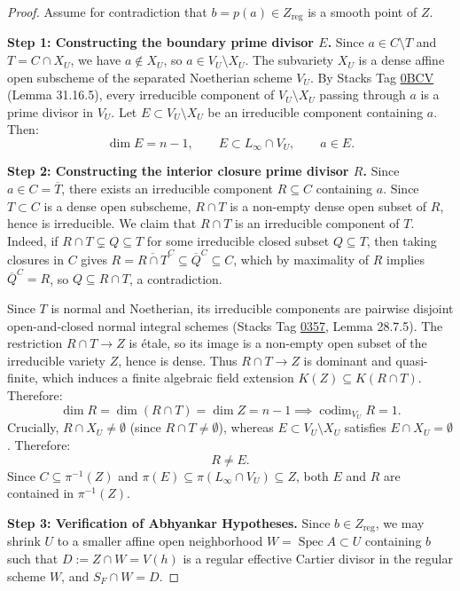 \documentclass[11pt,reqno]{amsart}
\theoremstyle{plain}
\theoremstyle{definition}
\numberwithin{equation}{section}
\DeclareMathOperator{\Spec}{Spec}
\DeclareMathOperator{\codim}{codim}
\begin{document}
\begin{proof}
Assume for contradiction that $b = p(a) \in Z_{\mathrm{reg}}$ is a smooth point of $Z$.

\medskip
\noindent\textbf{Step 1: Constructing the boundary prime divisor $E$.}
Since $a \in C \setminus T$ and $T = C \cap X_U$, we have $a \notin X_U$, so $a \in V_U \setminus X_U$.
The subvariety $X_U$ is a dense affine open subscheme of the separated Noetherian scheme $V_U$. By Stacks Tag \href{https://stacks.math.columbia.edu/tag/0BCV}{0BCV} (Lemma 31.16.5), every irreducible component of $V_U \setminus X_U$ passing through $a$ is a prime divisor in $V_U$. Let $E \subset V_U \setminus X_U$ be an irreducible component containing $a$. Then:
\[
\dim E = n-1, \qquad E \subset L_\infty \cap V_U, \qquad a \in E.
\]

\medskip
\noindent\textbf{Step 2: Constructing the interior closure prime divisor $R$.}
Since $a \in C = \overline{T}$, there exists an irreducible component $R \subseteq C$ containing $a$.
Since $T \subset C$ is a dense open subscheme, $R \cap T$ is a non-empty dense open subset of $R$, hence is irreducible.
We claim that $R \cap T$ is an irreducible component of $T$. Indeed, if $R \cap T \subsetneq Q \subseteq T$ for some irreducible closed subset $Q \subseteq T$, then taking closures in $C$ gives $R = \overline{R \cap T}^C \subseteq \overline{Q}^C \subseteq C$, which by maximality of $R$ implies $\overline{Q}^C = R$, so $Q \subseteq R \cap T$, a contradiction.

Since $T$ is normal and Noetherian, its irreducible components are pairwise disjoint open-and-closed normal integral schemes (Stacks Tag \href{https://stacks.math.columbia.edu/tag/0357}{0357}, Lemma 28.7.5). The restriction $R \cap T \to Z$ is \'{e}tale, so its image is a non-empty open subset of the irreducible variety $Z$, hence is dense. Thus $R \cap T \to Z$ is dominant and quasi-finite, which induces a finite algebraic field extension $K(Z) \subseteq K(R \cap T)$. Therefore:
\[
\dim R = \dim(R \cap T) = \dim Z = n-1 \implies \codim_{V_U} R = 1.
\]
Crucially, $R \cap X_U \neq \emptyset$ (since $R \cap T \neq \emptyset$), whereas $E \subset V_U \setminus X_U$ satisfies $E \cap X_U = \emptyset$. Therefore:
\[
R \neq E.
\]
Since $C \subseteq \pi^{-1}(Z)$ and $\pi(E) \subseteq \pi(L_\infty \cap V_U) \subseteq Z$, both $E$ and $R$ are contained in $\pi^{-1}(Z)$.

\medskip
\noindent\textbf{Step 3: Verification of Abhyankar Hypotheses.}
Since $b \in Z_{\mathrm{reg}}$, we may shrink $U$ to a smaller affine open neighborhood $W = \Spec A \subset U$ containing $b$ such that $D := Z \cap W = V(h)$ is a regular effective Cartier divisor in the regular scheme $W$, and $S_F \cap W = D$.


\end{proof}
\end{document}

